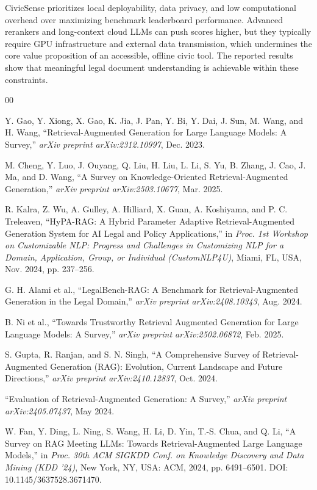 \documentclass[conference]{IEEEtran}
\begin{document}
CivicSense prioritizes local deployability, data privacy, and low computational overhead over maximizing benchmark leaderboard performance. Advanced rerankers and long-context cloud LLMs can push scores higher, but they typically require GPU infrastructure and external data transmission, which undermines the core value proposition of an accessible, offline civic tool. The reported results show that meaningful legal document understanding is achievable within these constraints.

\begin{thebibliography}{00}

 Y. Gao, Y. Xiong, X. Gao, K. Jia, J. Pan, Y. Bi, Y. Dai, J. Sun, M. Wang, and H. Wang, ``Retrieval-Augmented Generation for Large Language Models: A Survey,'' \textit{arXiv preprint arXiv:2312.10997}, Dec. 2023.

 M. Cheng, Y. Luo, J. Ouyang, Q. Liu, H. Liu, L. Li, S. Yu, B. Zhang, J. Cao, J. Ma, and D. Wang, ``A Survey on Knowledge-Oriented Retrieval-Augmented Generation,'' \textit{arXiv preprint arXiv:2503.10677}, Mar. 2025.

 R. Kalra, Z. Wu, A. Gulley, A. Hilliard, X. Guan, A. Koshiyama, and P. C. Treleaven, ``HyPA-RAG: A Hybrid Parameter Adaptive Retrieval-Augmented Generation System for AI Legal and Policy Applications,'' in \textit{Proc. 1st Workshop on Customizable NLP: Progress and Challenges in Customizing NLP for a Domain, Application, Group, or Individual (CustomNLP4U)}, Miami, FL, USA, Nov. 2024, pp. 237--256.

 G. H. Alami et al., ``LegalBench-RAG: A Benchmark for Retrieval-Augmented Generation in the Legal Domain,'' \textit{arXiv preprint arXiv:2408.10343}, Aug. 2024.

 B. Ni et al., ``Towards Trustworthy Retrieval Augmented Generation for Large Language Models: A Survey,'' \textit{arXiv preprint arXiv:2502.06872}, Feb. 2025.

 S. Gupta, R. Ranjan, and S. N. Singh, ``A Comprehensive Survey of Retrieval-Augmented Generation (RAG): Evolution, Current Landscape and Future Directions,'' \textit{arXiv preprint arXiv:2410.12837}, Oct. 2024.

 ``Evaluation of Retrieval-Augmented Generation: A Survey,'' \textit{arXiv preprint arXiv:2405.07437}, May 2024.

 W. Fan, Y. Ding, L. Ning, S. Wang, H. Li, D. Yin, T.-S. Chua, and Q. Li, ``A Survey on RAG Meeting LLMs: Towards Retrieval-Augmented Large Language Models,'' in \textit{Proc. 30th ACM SIGKDD Conf. on Knowledge Discovery and Data Mining (KDD '24)}, New York, NY, USA: ACM, 2024, pp. 6491--6501. DOI: 10.1145/3637528.3671470.


\end{thebibliography}
\end{document}
